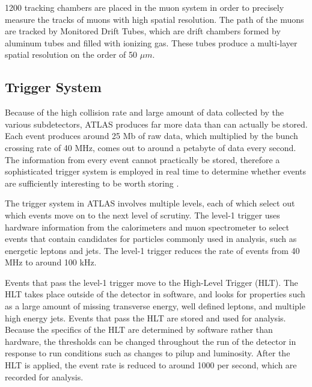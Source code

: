 1200 tracking chambers are placed in the muon system in order to precisely measure the tracks of muons with high spatial resolution. The path of the muons are tracked by Monitored Drift Tubes, which are drift chambers formed by aluminum tubes and filled with ionizing gas. These tubes produce a multi-layer spatial resolution on the order of 50 $\mu m$.


\subsection{Trigger System}
\label{sec:trigger}

Because of the high collision rate and large amount of data collected by the various subdetectors, ATLAS produces far more data than can actually be stored. Each event produces around 25 Mb of raw data, which multiplied by the bunch crossing rate of 40 MHz, comes out to around a petabyte of data every second. The information from every event cannot practically be stored, therefore a sophisticated trigger system is employed in real time to determine whether events are sufficiently interesting to be worth storing \cite{PERF-2011-02}.

The trigger system in ATLAS involves multiple levels, each of which select out which events move on to the next level of scrutiny. The level-1 trigger uses hardware information from the calorimeters and muon spectrometer to select events that contain candidates for particles commonly used in analysis, such as energetic leptons and jets. The level-1 trigger reduces the rate of events from 40 MHz to around 100 kHz. 

Events that pass the level-1 trigger move to the High-Level Trigger (HLT). The HLT takes place outside of the detector in software, and looks for properties such as a large amount of missing transverse energy, well defined leptons, and multiple high energy jets. Events that pass the HLT are stored and used for analysis. Because the specifics of the HLT are determined by software rather than hardware, the thresholds can be changed throughout the run of the detector in response to run conditions such as changes to pilup and luminosity. After the HLT is applied, the event rate is reduced to around 1000 per second, which are recorded for analysis.

